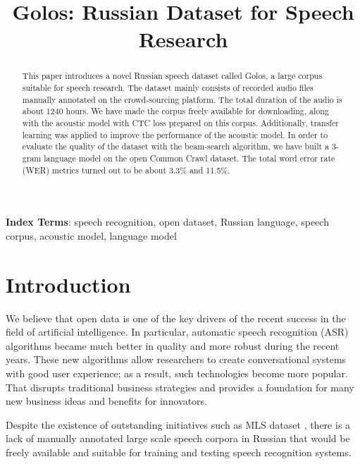 \documentclass[a4paper]{article}
\title{Golos: Russian Dataset for Speech Research}
\begin{document}
\maketitle
% 
\begin{abstract}
 
This paper introduces a novel Russian speech dataset called Golos, a large corpus suitable for speech research. The dataset mainly consists of recorded audio files manually annotated on the crowd-sourcing platform. The total duration of the audio is about 1240 hours. We have made the corpus freely available for downloading, along with the acoustic model with CTC loss prepared on this corpus. Additionally, transfer learning was applied to improve the performance of the acoustic model. In order to evaluate the quality of the dataset with the beam-search algorithm, we have built a 3-gram language model on the open Common Crawl dataset. The total word error rate (WER) metrics turned out to be about 3.3\% and 11.5\%.

\end{abstract}
\noindent\textbf{Index Terms}: speech recognition, open dataset, Russian language, speech corpus, acoustic model, language model

\section{Introduction}
We believe that open data is one of the key drivers of the recent success in the field of artificial intelligence. In particular, automatic speech recognition (ASR) algorithms became much better in quality and more robust during the recent years. These new algorithms allow researchers to create conversational systems with good user experience; as a result, such technologies become more popular. That disrupts traditional business strategies and provides a foundation for many new business ideas and benefits for innovators. 
  
Despite the existence of outstanding initiatives such as MLS dataset \cite{pratap2020mls}, there is a lack of manually annotated large scale speech corpora in Russian that would be freely available and suitable for training and testing speech recognition systems.
 
\end{document}
